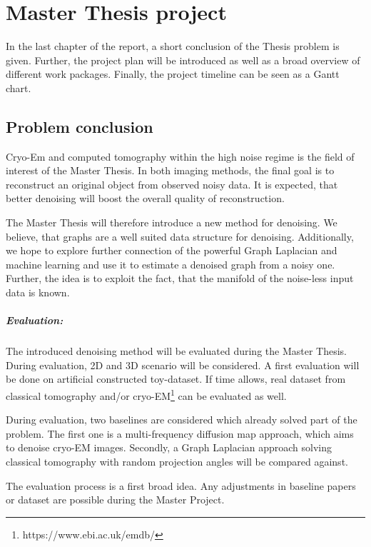 \chapter{Master Thesis project}
\label{sec:projectOverview}
In the last chapter of the report, a short conclusion of the Thesis problem is given.
Further, the project plan will be introduced as well as a broad overview of different 
work packages. Finally, the project timeline can be seen as a Gantt chart.

\section{Problem conclusion}

Cryo-Em and computed tomography within the high noise regime is the field of interest of the Master Thesis.
In both imaging methods, the final goal is to reconstruct an original object from observed noisy data. 
It is expected, that better denoising will boost the overall 
quality of reconstruction. 

The Master Thesis will therefore introduce a new method for denoising. 
We believe, that graphs are a well suited data structure for denoising.
Additionally, we hope to explore further connection of the powerful Graph Laplacian
and machine learning and use it to estimate a denoised graph from a noisy one.
Further, the idea is to exploit the fact, that the manifold of the 
noise-less input data is known.

\paragraph{Evaluation:}
The introduced denoising method will be evaluated during the Master Thesis.
During evaluation, 2D and 3D scenario will be considered.
 A first evaluation will be done on artificial constructed toy-dataset.
 If time allows, real dataset from classical tomography and/or cryo-EM\footnote{https://www.ebi.ac.uk/emdb/} can be evaluated as well.

During evaluation, two baselines are considered which already solved part of the problem. 
The first one is a multi-frequency diffusion map approach\cite{multiDiffusionMaps, cryoEmMutliDM}, which aims to denoise cryo-EM images. 
Secondly, \cite{LaplaceRandomProjections} a Graph Laplacian approach solving classical tomography with random projection angles will be compared against.

The evaluation process is a first broad idea. Any adjustments in baseline papers or dataset are possible during 
the Master Project.

